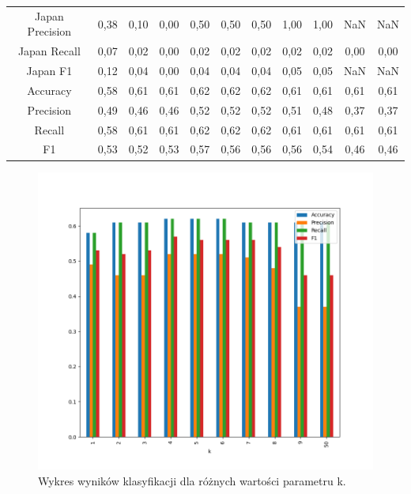 \documentclass{classrep}
\begin{document}
\begin{table}[h!]
\begin{tabular}{c c c c c c c c c c c}
\hline
Japan Precision 		& 0,38 & 0,10 & 0,00 & 0,50 & 0,50  & 0,50 & 1,00 & 1,00 & NaN & NaN \\
Japan Recall 			& 0,07 & 0,02 & 0,00 & 0,02 & 0,02 & 0,02 & 0,02 & 0,02 & 0,00 & 0,00 \\
Japan F1 				& 0,12 & 0,04 & 0,00 & 0,04 & 0,04  & 0,04 & 0,05 & 0,05 & NaN & NaN\\
\hline
Accuracy 				& 0,58 & 0,61 & 0,61 & 0,62 & 0,62 & 0,62 & 0,61 & 0,61 & 0,61 & 0,61 \\
Precision 				& 0,49 & 0,46 & 0,46 & 0,52 & 0,52  & 0,52 & 0,51 &  0,48  & 0,37 & 0,37\\
Recall 				& 0,58 & 0,61 & 0,61 & 0,62 & 0,62 & 0,62 & 0,61 & 0,61 & 0,61 & 0,61  \\
F1 					& 0,53 & 0,52 & 0,53 & 0,57 & 0,56 & 0,56 & 0,56 & 0,54 & 0,46 & 0,46\\

\end {tabular}
\label {Wyniki klasyfikacji dla różnych wartości parametru k.}
\end{table}

\newpage

\begin{figure}[h!]
 \centering
 \includegraphics[width=15cm]{wykres_k.png}
 \vspace{-0.3cm}
 \caption{Wykres wyników klasyfikacji dla różnych wartości parametru k.}
 \label{wykres1}
\end{figure}
\end{document}
